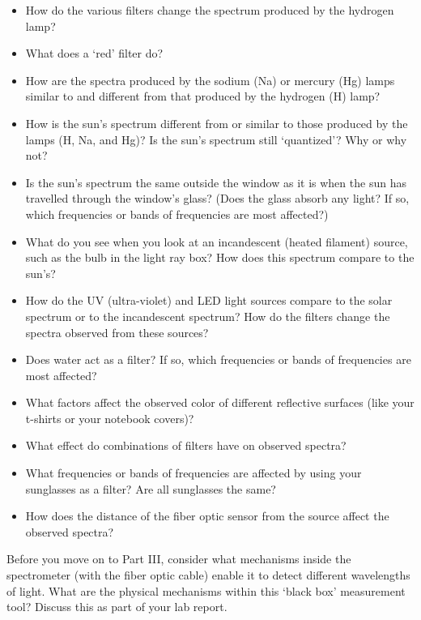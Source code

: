 \begin{itemize}
\item How do the various filters change the spectrum produced by the hydrogen lamp?
\item What does a ‘red’ filter do?
\item How are the spectra produced by the sodium (Na) or mercury (Hg) lamps similar to and different from that produced by the hydrogen (H) lamp?
\item How is the sun’s spectrum different from or similar to those produced by the lamps (H, Na, and Hg)? Is the sun’s spectrum still ‘quantized’? Why or why not?
\item Is the sun’s spectrum the same outside the window as it is when the sun has travelled through the window’s glass? (Does the glass absorb any light? If so, which frequencies or bands of frequencies are most affected?)
\item What do you see when you look at an incandescent (heated filament) source, such as the bulb in the light ray box? How does this spectrum compare to the sun’s?
\item How do the UV (ultra-violet) and LED light sources compare to the solar spectrum or to the incandescent spectrum? How do the filters change the spectra observed from these sources?
\item Does water act as a filter? If so, which frequencies or bands of frequencies are most affected?
\item What factors affect the observed color of different reflective surfaces (like your t-shirts or your notebook covers)?
\item What effect do combinations of filters have on observed spectra?
\item What frequencies or bands of frequencies are affected by using your sunglasses as a filter? Are all sunglasses the same?
\item How does the distance of the fiber optic sensor from the source affect the observed spectra?
\end{itemize}
Before you move on to Part III, consider what mechanisms inside the spectrometer (with the fiber optic cable) enable it to detect different wavelengths of light. 
What are the physical mechanisms within this ‘black box’ measurement tool? 
Discuss this as part of your lab report.

